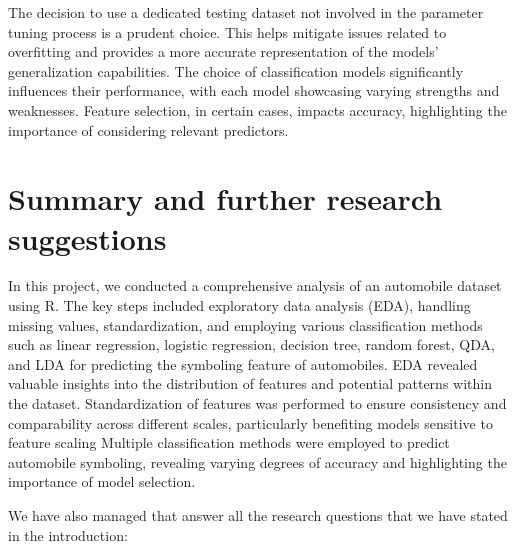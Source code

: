 \documentclass[11pt,a4paper]{article}\usepackage[]{graphicx}\usepackage[]{xcolor}
\begin{document}
The decision to use a dedicated testing dataset not involved in the parameter tuning process is a prudent choice. This helps mitigate issues related to overfitting and provides a more accurate representation of the models' generalization capabilities.	
	The choice of classification models significantly influences their performance, with each model showcasing varying strengths and weaknesses.
Feature selection, in certain cases, impacts accuracy, highlighting the importance of considering relevant predictors.







	
	\section{Summary and further research suggestions}
	
	In this project, we conducted a comprehensive analysis of an automobile dataset using R. The key steps included exploratory data analysis (EDA), handling missing values, standardization, and employing various classification methods such as linear regression, logistic regression, decision tree, random forest, QDA, and LDA for predicting the symboling feature of automobiles. EDA revealed valuable insights into the distribution of features and potential patterns within the dataset.
Standardization of features was performed to ensure consistency and comparability across different scales, particularly benefiting models sensitive to feature scaling
Multiple classification methods were employed to predict automobile symboling, revealing varying degrees of accuracy and highlighting the importance of model selection.

We have also managed that answer all the research questions that we have stated in the introduction:
\end{document}
